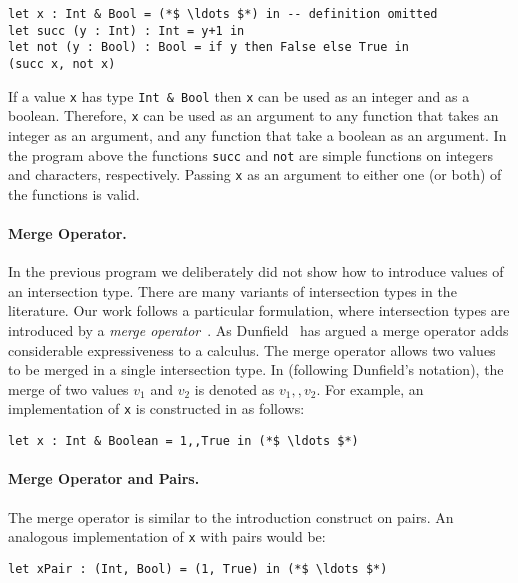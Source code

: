 \begin{lstlisting}
let x : Int & Bool = (*$ \ldots $*) in -- definition omitted
let succ (y : Int) : Int = y+1 in
let not (y : Bool) : Bool = if y then False else True in
(succ x, not x)
\end{lstlisting}

\noindent If a value \lstinline{x} has type \lstinline{Int & Bool} then
\lstinline{x} can be used as an integer and as a boolean. Therefore,
\lstinline{x} can be used as an argument to any function that takes
an integer as an argument, and any
function that take a boolean as an argument. In the program above
the functions \lstinline{succ} and \lstinline{not} are 
simple functions on integers and characters, respectively.
Passing \lstinline{x} as an argument to either one (or both) of the
functions is valid.

\paragraph{Merge Operator.}
In the previous program we deliberately did not show how to introduce
values of an intersection type. There are many variants of
intersection types in the literature. Our work follows a particular
formulation, where intersection types are introduced by a \emph{merge
  operator}~\cite{reynolds1991coherence,Castagna92calculus,dunfield2014elaborating}. 
As Dunfield~\cite{dunfield2014elaborating} has argued a
merge operator adds considerable expressiveness to a calculus. The
merge operator allows two values to be merged in a single intersection
type. In \name (following Dunfield's notation), the merge of two
values $v_1$ and $v_2$ is denoted as $v_1 ,, v_2$.  For example, an
implementation of \lstinline{x} is constructed in \name as follows:

\begin{lstlisting}
let x : Int & Boolean = 1,,True in (*$ \ldots $*)
\end{lstlisting}

\paragraph{Merge Operator and Pairs.}
The merge operator is similar to the introduction construct on pairs.
An analogous implementation of \lstinline{x} with pairs would be:

\begin{lstlisting}
let xPair : (Int, Bool) = (1, True) in (*$ \ldots $*)
\end{lstlisting}

